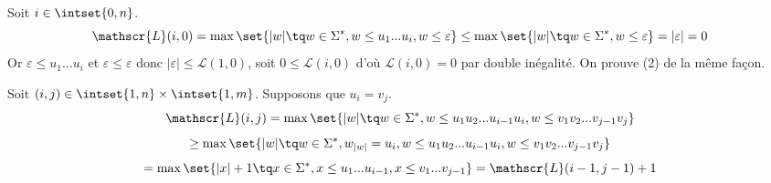 \documentclass{scrartcl}
\begin{document}
			\begin{demo}
				\item Soit $i \in \intset{0,n}$. 
				\[
					\mathscr{L}(i,0) 
					= \max\set{|w| \tq w \in \Sigma^* , w \leq u_1...u_i, w \leq \varepsilon}
					\leq \max \set{|w| \tq w \in \Sigma^*, w \leq \varepsilon}
					= |\varepsilon| = 0
				\]
				Or $\varepsilon \leq u_1...u_i$ et $\varepsilon \leq \varepsilon$ donc $|\varepsilon| \leq \mathscr{L}(1,0)$,
				soit $0 \leq \mathscr{L}(i,0)$ d'où $\mathscr{L}(i,0) = 0$ par double inégalité. On prouve (2) de la même façon.

				\item Soit $(i,j) \in \intset{1,n}\times\intset{1,m}$. Supposons que $u_i = v_j$. 
				\[
					\mathscr{L}(i,j) = 
					\max\set{|w| \tq w \in \Sigma^*, w \leq u_1u_2...u_{i-1}u_i, w \leq v_1v_2...v_{j-1}v_j}
				\]
				\[
					\geq \max\set{|w| \tq w \in \Sigma^*, w_{|w|} = u_i, w \leq u_1u_2...u_{i-1}u_i, w \leq v_1v_2...v_{j-1}v_j}
				\]
				\[
					= \max\set{|x| + 1 \tq x \in \Sigma^*, x \leq u_1...u_{i-1}, x \leq v_1...v_{j-1}}
					= \mathscr{L}(i-1,j-1) + 1
				\]
				

\end{demo}
\end{document}
